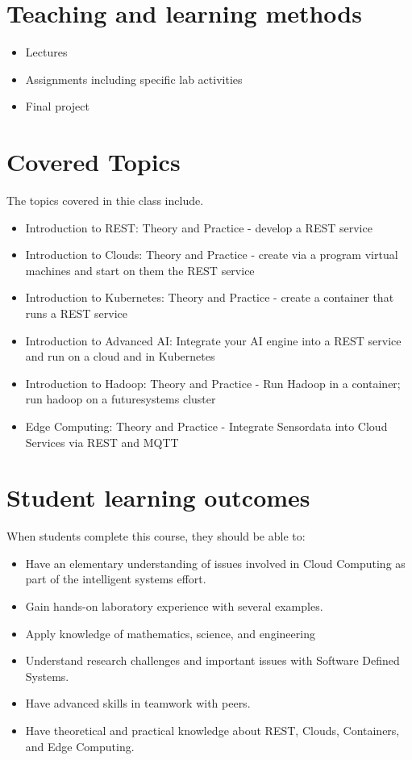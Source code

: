 \section{Teaching and learning methods}


\begin{itemize}
\item Lectures
\item Assignments including specific lab activities
\item Final project 
\end{itemize}

\section{Covered Topics}

The topics covered in thie class include.

\begin{itemize}
\item Introduction to REST: Theory and Practice - develop a REST service
\item Introduction to Clouds: Theory and Practice - create via a
  program virtual machines and start on them the REST service
\item Introduction to Kubernetes: Theory and Practice - create a
  container that runs a REST service
\item Introduction to Advanced AI: Integrate your AI engine into a
  REST service and run on a cloud and in Kubernetes 
\item Introduction to Hadoop: Theory and Practice - Run Hadoop in a
  container; run hadoop on a futuresystems cluster
\item Edge Computing: Theory and Practice - Integrate Sensordata into
  Cloud Services via REST and MQTT
\end{itemize}


\section{Student learning outcomes}

When students complete this course, they should be able to:

\begin{itemize}
\item Have an elementary understanding of issues involved in Cloud
  Computing as part of the intelligent systems effort.
\item Gain hands-on laboratory experience with several examples.
\item Apply knowledge of mathematics, science, and engineering
\item Understand research challenges and important issues with
  Software Defined Systems.
\item	Have advanced skills in teamwork with peers.
\item Have theoretical and practical knowledge about REST, Clouds,
  Containers, and Edge Computing.
\end{itemize}


